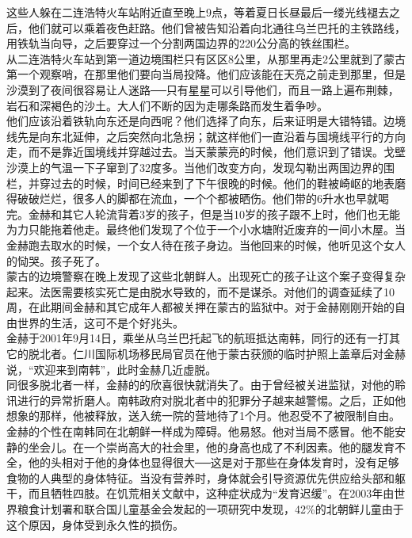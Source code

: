 \begin{multicols}{\theparacolNo}
这些人躲在二连浩特火车站附近直至晚上9点，等着夏日长昼最后一缕光线褪去之后，他们就可以乘着夜色赶路。他们曾被告知沿着向北通往乌兰巴托的主铁路线，用铁轨当向导，之后要穿过一个分割两国边界的220公分高的铁丝围栏。\\

从二连浩特火车站到第一道边境围栏只有区区8公里，从那里再走2公里就到了蒙古第一个观察哨，在那里他们要向当局投降。他们应该能在天亮之前走到那里，但是沙漠到了夜间很容易让人迷路──只有星星可以引导他们，而且一路上遍布荆棘，岩石和深褐色的沙土。大人们不断的因为走哪条路而发生着争吵。\\

他们应该沿着铁轨向东还是向西呢？他们选择了向东，后来证明是大错特错。边境线先是向东北延伸，之后突然向北急拐；就这样他们一直沿着与国境线平行的方向走，而不是靠近国境线并穿越过去。当天蒙蒙亮的时候，他们意识到了错误。戈壁沙漠上的气温一下子窜到了32度多。当他们改变方向，发现勾勒出两国边界的围栏，并穿过去的时候，时间已经来到了下午很晚的时候。他们的鞋被崎岖的地表磨得破破烂烂，很多人的脚都在流血，一个个都被晒伤。他们带的6升水也早就喝完。金赫和其它人轮流背着3岁的孩子，但是当10岁的孩子跟不上时，他们也无能为力只能拖着他走。最终他们发现了个位于一个小水塘附近废弃的一间小木屋。当金赫跑去取水的时候，一个女人待在孩子身边。当他回来的时候，他听见这个女人的恸哭。孩子死了。\\

蒙古的边境警察在晚上发现了这些北朝鲜人。出现死亡的孩子让这个案子变得复杂起来。法医需要核实死亡是由脱水导致的，而不是谋杀。对他们的调查延续了10周，在此期间金赫和其它成年人都被关押在蒙古的监狱中。对于金赫刚刚开始的自由世界的生活，这可不是个好兆头。\\

金赫于2001年9月14日，乘坐从乌兰巴托起飞的航班抵达南韩，同行的还有一打其它的脱北者。仁川国际机场移民局官员在他于蒙古获颁的临时护照上盖章后对金赫说，“欢迎来到南韩”，此时金赫几近虚脱。\\

同很多脱北者一样，金赫的的欣喜很快就消失了。由于曾经被关进监狱，对他的聆讯进行的异常折磨人。南韩政府对脱北者中的犯罪分子越来越警惕。之后，正如他想象的那样，他被释放，送入统一院的营地待了1个月。他忍受不了被限制自由。\\

金赫的个性在南韩同在北朝鲜一样成为障碍。他易怒。他对当局不感冒。他不能安静的坐会儿。在一个崇尚高大的社会里，他的身高也成了不利因素。他的腿发育不全，他的头相对于他的身体也显得很大──这是对于那些在身体发育时，没有足够食物的人典型的身体特征。当没有营养时，身体就会引导资源优先供应给头部和躯干，而且牺牲四肢。在饥荒相关文献中，这种症状成为“发育迟缓”。在2003年由世界粮食计划署和联合国儿童基金会发起的一项研究中发现，42\%的北朝鲜儿童由于这个原因，身体受到永久性的损伤。\\


\end{multicols}

